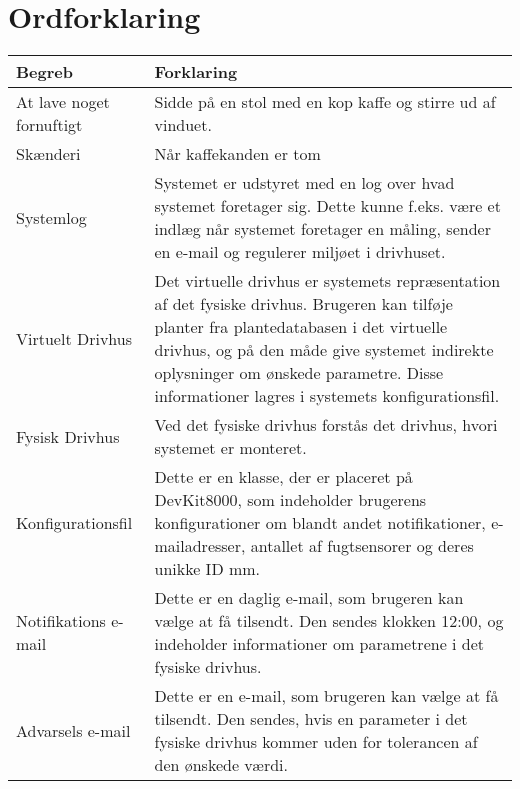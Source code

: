 \clearpage

\section{Ordforklaring}

\begin{table}[h]
\centering
\begin{tabularx}{/10}{| l | Z |}
\hline
\textbf{Begreb} & \textbf{Forklaring} \\\hline
	At lave noget fornuftigt & 
	Sidde på en stol med en kop kaffe og stirre ud af vinduet. \\\hline
	Skænderi &
Når kaffekanden er tom \\\hline
	Systemlog &
Systemet er udstyret med en log over hvad systemet foretager sig. Dette kunne f.eks. være et indlæg når systemet foretager en måling, sender en e-mail og regulerer miljøet i drivhuset. \\\hline
	Virtuelt Drivhus &
Det virtuelle drivhus er systemets repræsentation af det fysiske drivhus. Brugeren kan tilføje planter fra plantedatabasen i det virtuelle drivhus, og på den måde give systemet indirekte oplysninger om ønskede parametre. Disse informationer lagres i systemets konfigurationsfil. \\\hline
	Fysisk Drivhus &
Ved det fysiske drivhus forstås det drivhus, hvori systemet er monteret. \\\hline
	Konfigurationsfil &
Dette er en klasse, der er placeret på DevKit8000, som indeholder brugerens konfigurationer om blandt andet notifikationer, e-mailadresser, antallet af fugtsensorer og deres unikke ID mm. \\\hline
	Notifikations e-mail &
Dette er en daglig e-mail, som brugeren kan vælge at få tilsendt. Den sendes klokken 12:00, og indeholder informationer om parametrene i det fysiske drivhus. \\\hline
	Advarsels e-mail &
Dette er en e-mail, som brugeren kan vælge at få tilsendt. Den sendes, hvis en parameter i det fysiske drivhus kommer uden for tolerancen af den ønskede værdi. \\\hline
\end{tabularx}
\end{table}

\clearpage
